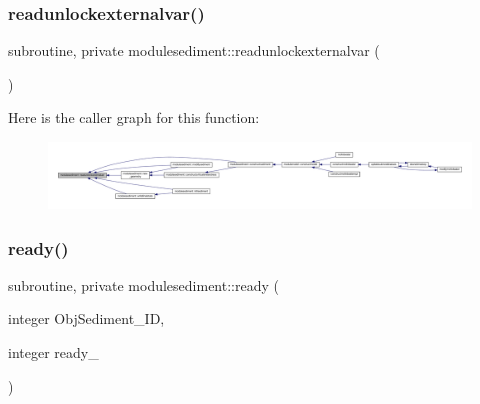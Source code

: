 \subsubsection{\texorpdfstring{readunlockexternalvar()}{readunlockexternalvar()}}
{\footnotesize\ttfamily subroutine, private modulesediment\+::readunlockexternalvar (\begin{DoxyParamCaption}{ }\end{DoxyParamCaption})\hspace{0.3cm}{\ttfamily [private]}}

Here is the caller graph for this function\+:\nopagebreak
\begin{figure}[H]
\begin{center}
\leavevmode
\includegraphics[width=350pt]{namespacemodulesediment_a8c3164236748ba94c8bef14c5dd430b9_icgraph}
\end{center}
\end{figure}
\mbox{\label{namespacemodulesediment_a2427e7af36c908526797cc897f1dca07}} 
\subsubsection{\texorpdfstring{ready()}{ready()}}
{\footnotesize\ttfamily subroutine, private modulesediment\+::ready (\begin{DoxyParamCaption}\item[{integer}]{Obj\+Sediment\+\_\+\+ID,  }\item[{integer}]{ready\+\_\+ }\end{DoxyParamCaption})\hspace{0.3cm}{\ttfamily [private]}}

